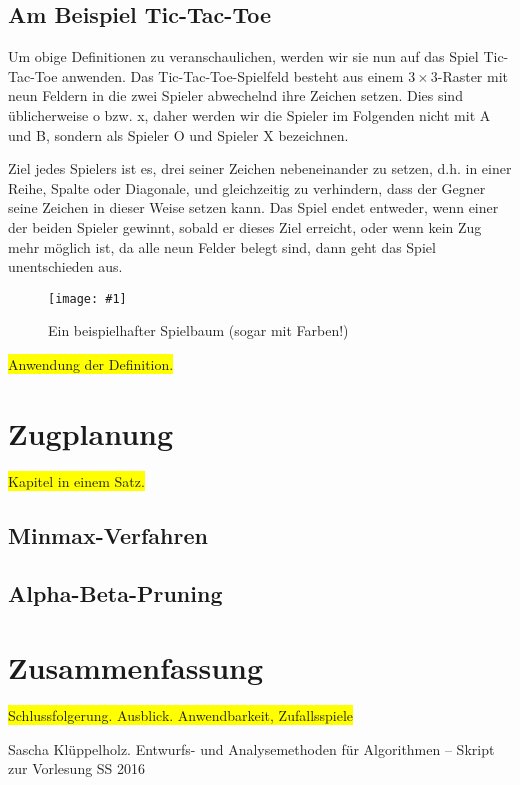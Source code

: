 \documentclass[a4paper,twoside]{scrartcl}
\newcommand\q[1]{\glqq #1\grqq}
\newcommand\g[2]{%
  \begin{figure}[!ht]
  \centering
  \texttt{[image: \#1]}
  \caption{#2}
  \end{figure}}
\newcommand\todo[1]{\colorbox{yellow}{#1}}
\begin{document}
\subsection{Am Beispiel Tic-Tac-Toe}

Um obige Definitionen zu veranschaulichen, werden wir sie nun auf das Spiel Tic-Tac-Toe anwenden. Das Tic-Tac-Toe-Spielfeld besteht aus einem $3 \times 3$-Raster mit neun Feldern in die zwei Spieler abwechelnd ihre Zeichen setzen. Dies sind üblicherweise \q{o} bzw. \q{x}, daher werden wir die Spieler im Folgenden nicht mit A und B, sondern als \q{Spieler O} und \q{Spieler X} bezeichnen.

Ziel jedes Spielers ist es, drei seiner Zeichen nebeneinander zu setzen, d.h. in einer Reihe, Spalte oder Diagonale, und gleichzeitig zu verhindern, dass der Gegner seine Zeichen in dieser Weise setzen kann. Das Spiel endet entweder, wenn einer der beiden Spieler gewinnt, sobald er dieses Ziel erreicht, oder wenn kein Zug mehr möglich ist, da alle neun Felder belegt sind, dann geht das Spiel unentschieden aus.

\g{tic.pdf}{Ein beispielhafter Spielbaum (sogar mit Farben!)}

\todo{Anwendung der Definition.}

\section{Zugplanung}
\todo{Kapitel in einem Satz.}

\subsection{Minmax-Verfahren}



\subsection{Alpha-Beta-Pruning}

\section{Zusammenfassung}
\todo{Schlussfolgerung. Ausblick. Anwendbarkeit, Zufallsspiele}

\begin{thebibliography}{99}

 Sascha Klüppelholz.
\newblock Entwurfs- und Analysemethoden für Algorithmen -- Skript zur Vorlesung SS 2016
 
\end{thebibliography}
\end{document}

